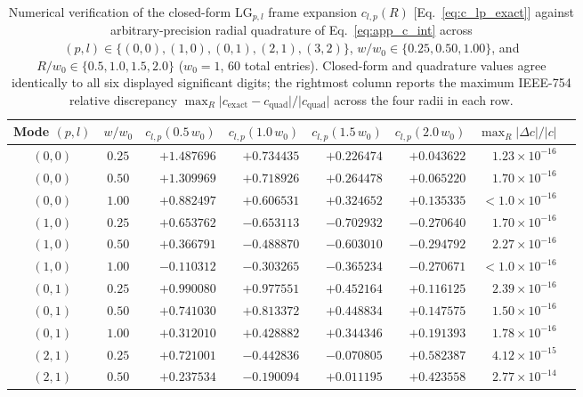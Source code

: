 \documentclass[aps,pra,reprint,amsmath,amssymb,floatfix,longbibliography]{revtex4-2}
\providecommand{\abs}[1]{\lvert#1\rvert}
\begin{document}
\begin{table}[t]
\caption{Numerical verification of the closed-form $\mathrm{LG}_{p,l}$ frame expansion $c_{l,p}(R)$ [Eq.~\eqref{eq:c_lp_exact}] against arbitrary-precision radial quadrature of Eq.~\eqref{eq:app_c_int} across $(p,l) \in \{(0,0),(1,0),(0,1),(2,1),(3,2)\}$, $w/w_0 \in \{0.25, 0.50, 1.00\}$, and $R/w_0 \in \{0.5, 1.0, 1.5, 2.0\}$ ($w_0 = 1$, 60 total entries). Closed-form and quadrature values agree identically to all six displayed significant digits; the rightmost column reports the maximum IEEE-754 relative discrepancy $\max_R \abs{c_{\mathrm{exact}} - c_{\mathrm{quad}}}/\abs{c_{\mathrm{quad}}}$ across the four radii in each row.}
\label{tab:c_lp_verification}
\begin{ruledtabular}
\footnotesize
\setlength{\tabcolsep}{4pt}
\begin{tabular}{ccrrrrrc}
Mode $(p,l)$ & $w / w_0$ & $c_{l,p}(0.5\,w_0)$ & $c_{l,p}(1.0\,w_0)$ & $c_{l,p}(1.5\,w_0)$ & $c_{l,p}(2.0\,w_0)$ & $\max_R \abs{\Delta c}/\abs{c}$ \\
\hline
$(0,0)$ & $0.25$ & $+1.487696$ & $+0.734435$ & $+0.226474$ & $+0.043622$ & $1.23\times 10^{-16}$ \\
$(0,0)$ & $0.50$ & $+1.309969$ & $+0.718926$ & $+0.264478$ & $+0.065220$ & $1.70\times 10^{-16}$ \\
$(0,0)$ & $1.00$ & $+0.882497$ & $+0.606531$ & $+0.324652$ & $+0.135335$ & $<1.0\times 10^{-16}$ \\
\hline
$(1,0)$ & $0.25$ & $+0.653762$ & $-0.653113$ & $-0.702932$ & $-0.270640$ & $1.70\times 10^{-16}$ \\
$(1,0)$ & $0.50$ & $+0.366791$ & $-0.488870$ & $-0.603010$ & $-0.294792$ & $2.27\times 10^{-16}$ \\
$(1,0)$ & $1.00$ & $-0.110312$ & $-0.303265$ & $-0.365234$ & $-0.270671$ & $<1.0\times 10^{-16}$ \\
\hline
$(0,1)$ & $0.25$ & $+0.990080$ & $+0.977551$ & $+0.452164$ & $+0.116125$ & $2.39\times 10^{-16}$ \\
$(0,1)$ & $0.50$ & $+0.741030$ & $+0.813372$ & $+0.448834$ & $+0.147575$ & $1.50\times 10^{-16}$ \\
$(0,1)$ & $1.00$ & $+0.312010$ & $+0.428882$ & $+0.344346$ & $+0.191393$ & $1.78\times 10^{-16}$ \\
\hline
$(2,1)$ & $0.25$ & $+0.721001$ & $-0.442836$ & $-0.070805$ & $+0.582387$ & $4.12\times 10^{-15}$ \\
$(2,1)$ & $0.50$ & $+0.237534$ & $-0.190094$ & $+0.011195$ & $+0.423558$ & $2.77\times 10^{-14}$ \\

\end{tabular}
\end{ruledtabular}
\end{table}
\end{document}
